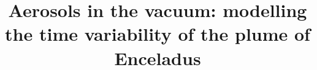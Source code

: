 \documentclass[draft]{agujournal2019}
\begin{document}
%
%


\title{Aerosols in the vacuum: modelling the time variability of the plume of Enceladus}

%
%















\end{document}

